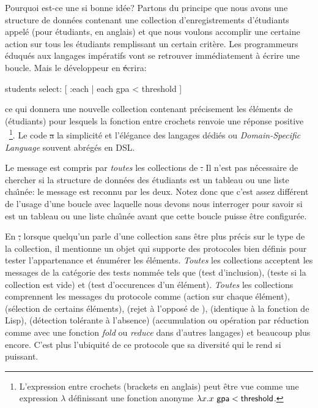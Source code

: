 \documentclass[a4paper,10pt,twoside]{book}
\begin{document}
Pourquoi est-ce une si bonne id\'ee?
Partons du principe que nous avons une structure de donn\'ees contenant
une collection d'enregistrements d'\'etudiants appel\'e 
(pour \'etudiants, en anglais) et que nous voulons
accomplir une certaine action sur tous les \'etudiants remplissant un
certain crit\`ere.
Les programmeurs \'eduqu\'es aux langages imp\'eratifs vont se retrouver
imm\'ediatement à écrire une boucle. Mais le développeur en \st \'ecrira:
\begin{code}{}
students select: [ :each | each gpa < threshold ]
\end{code}
\noindent
ce qui donnera une nouvelle collection contenant pr\'ecisement les
\'el\'ements de  (\'etudiants) pour lesquels la
fonction entre crochets renvoie une r\'eponse positive \cad {}~\footnote{L'expression entre crochets (brackets en anglais) peut \^etre vue comme une 
expression $\lambda$ d\'efinissant une fonction anonyme $\lambda x. x~{\sf gpa} < {\sf threshold}$.
}.
Le code \st a la simplicit\'e et l'\'el\'egance des langages d\'edi\'es ou \emph{Domain-Specific Language} souvent abr\'eg\'es en DSL. 

Le message  est compris par \emph{toutes} les collections de \st.
Il n'est pas n\'ecessaire de chercher si la structure de donn\'ees des \'etudiants est un tableau ou une liste cha\^{\i}n\'ee: 
le message  est reconnu par les deux. 
Notez donc que c'est assez diff\'erent de l'usage d'une boucle avec laquelle
nous devons nous interroger pour savoir si  est un tableau
ou une liste cha\^{\i}n\'ee avant que cette boucle puisse \^etre configur\'ee.

En \st, lorsque quelqu'un parle d'une collection sans \^etre plus pr\'ecis
sur le type de la collection, il mentionne un objet qui supporte des protocoles
bien d\'efinis pour tester l'appartenance et \'enum\'erer les \'el\'ements.
\emph{Toutes} les collections acceptent les messages 
de la cat\'egorie des tests nomm\'ee  tels que \mbox{} (test d'inclusion),  (teste si la collection est vide) 
et \mbox{} (test d'occurences d'un \'el\'ement). 
\emph{Toutes} les collections comprennent les messages du protocole 
 comme 
 (action sur chaque \'el\'ement), 
 (s\'election de certains \'el\'ements), 
 (rejet \`a l'oppos\'e de ), 
 (identique \`a la fonction  de Lisp),
 (d\'etection tol\'erante \`a l'absence) 
 (accumulation ou op\'eration par r\'eduction 
comme avec une fonction \emph{fold} ou \emph{reduce} dans d'autres langages) et
beaucoup plus encore.
C'est plus l'ubiquit\'e de ce protocole que sa diversit\'e qui le rend
si puissant.
\end{document}
